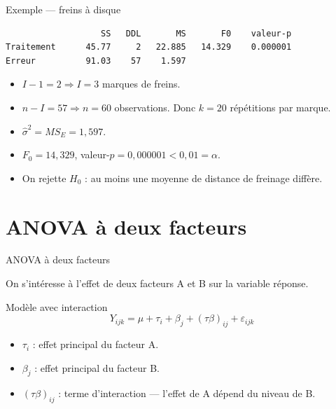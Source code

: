 \documentclass{BeamerTemplate}
\begin{document}
\begin{frame}[t]{Exemple — freins à disque}

\begin{verbatim}
                   SS   DDL       MS       F0    valeur-p
Traitement      45.77     2   22.885   14.329    0.000001
Erreur          91.03    57    1.597
\end{verbatim}

\begin{itemize}\itemsep4mm
  \item $I-1=2 \Rightarrow I=3$ marques de freins.
  \item $n-I=57 \Rightarrow n=60$ observations. Donc $k=20$ répétitions par marque.
  \item $\hat{\sigma}^2 = MS_E = 1{,}597$.
  \item $F_0 = 14{,}329$, valeur-$p = 0{,}000001 < 0{,}01 = \alpha$.
  \item \alert{On rejette $H_0$} : au moins une moyenne de distance de freinage diffère.
\end{itemize}

\end{frame}

\section{ANOVA à deux facteurs}

\begin{frame}[t]{ANOVA à deux facteurs}

On s'intéresse à l'effet de \alert{deux facteurs} A et B sur la variable réponse.

\bigskip
\begin{Boite}{Modèle avec interaction}
$$Y_{ijk} = \mu + \tau_i + \beta_j + (\tau\beta)_{ij} + \varepsilon_{ijk}$$
\end{Boite}

\begin{itemize}\itemsep4mm
  \item $\tau_i$ : effet principal du facteur A.
  \item $\beta_j$ : effet principal du facteur B.
  \item $(\tau\beta)_{ij}$ : \alert{terme d'interaction} — l'effet de A dépend du niveau de B.
\end{itemize}

\end{frame}
\end{document}
